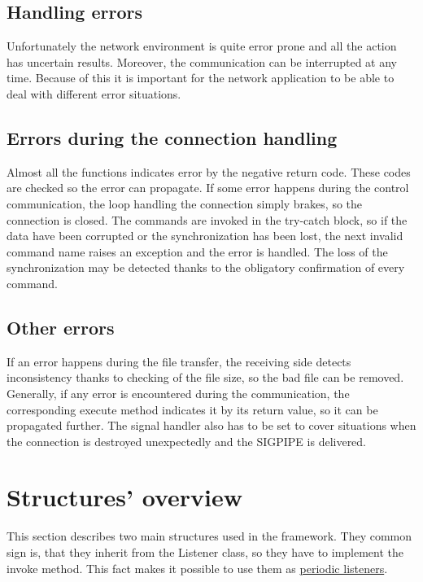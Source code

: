 \subsection{Handling errors}\label{handling-errors}

Unfortunately the network environment is quite error prone and all the
action has uncertain results. Moreover, the communication can be
interrupted at any time. Because of this it is important for the network
application to be able to deal with different error situations.

\subsection*{Errors during the connection handling}

Almost all the functions indicates error by the negative return code.
These codes are checked so the error can propagate. If some error
happens during the control communication, the loop handling the
connection simply brakes, so the connection is closed. The commands are
invoked in the try-catch block, so if the data have been corrupted or
the synchronization has been lost, the next invalid command name raises
an exception and the error is handled. The loss of the synchronization
may be detected thanks to the obligatory confirmation of every command.

\subsection*{Other errors}

If an error happens during the file transfer, the receiving side detects
inconsistency thanks to checking of the file size, so the bad file can
be removed. Generally, if any error is encountered during the
communication, the corresponding execute method indicates it by its
return value, so it can be propagated further. The signal handler also
has to be set to cover situations when the connection is destroyed
unexpectedly and the SIGPIPE is delivered.

\section{Structures' overview}\label{structures-overview}

This section describes two main structures used in the framework. They
common sign is, that they inherit from the Listener class, so they have
to implement the invoke method. This fact makes it possible to use them
as \hyperref[periodic-actions]{periodic listeners}.

